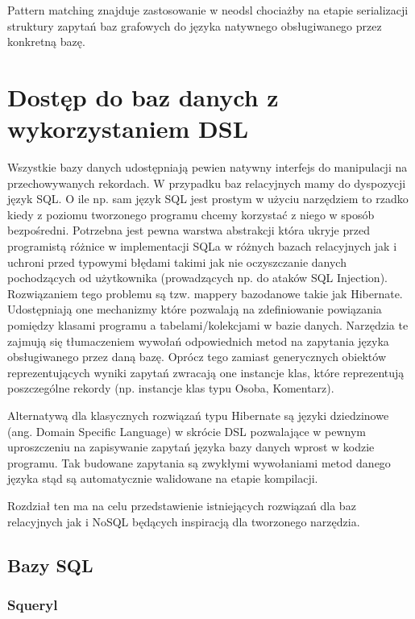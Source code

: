 \documentclass[brudnopis]{xmgr}
\begin{document}
\inputminted{scala}{listings/scala/pattern-matching-trees.scala}

Pattern matching znajduje zastosowanie w neodsl chociażby na etapie serializacji struktury zapytań baz grafowych do języka natywnego obsługiwanego przez konkretną bazę.

\chapter{Dostęp do baz danych z wykorzystaniem DSL}

Wszystkie bazy danych udostępniają pewien natywny interfejs do manipulacji na przechowywanych rekordach. W przypadku baz relacyjnych mamy do dyspozycji język SQL. O ile np. sam język SQL jest prostym w użyciu narzędziem to rzadko kiedy z poziomu tworzonego programu chcemy korzystać z niego w sposób bezpośredni. Potrzebna jest pewna warstwa abstrakcji która ukryje przed programistą różnice w implementacji SQLa w różnych bazach relacyjnych jak i uchroni przed typowymi błędami takimi jak nie oczyszczanie danych pochodzących od użytkownika (prowadzących np. do ataków SQL Injection). Rozwiązaniem tego problemu są tzw. mappery bazodanowe takie jak Hibernate. Udostępniają one mechanizmy które pozwalają na zdefiniowanie powiązania pomiędzy klasami programu a tabelami/kolekcjami w bazie danych. Narzędzia te zajmują się tłumaczeniem wywołań odpowiednich metod na zapytania języka obsługiwanego przez daną bazę. Oprócz tego zamiast generycznych obiektów reprezentujących wyniki zapytań zwracają one instancje klas, które reprezentują poszczególne rekordy (np. instancje klas typu Osoba, Komentarz).

Alternatywą dla klasycznych rozwiązań typu Hibernate są języki dziedzinowe (ang. Domain Specific Language) w skrócie DSL pozwalające w pewnym uproszczeniu na zapisywanie zapytań języka bazy danych wprost w kodzie programu. Tak budowane zapytania są zwykłymi wywołaniami metod danego języka stąd są automatycznie walidowane na etapie kompilacji.

Rozdział ten ma na celu przedstawienie istniejących rozwiązań dla baz relacyjnych jak i NoSQL będących inspiracją dla tworzonego narzędzia.

\section{Bazy SQL}

\subsection{Squeryl}
\end{document}
